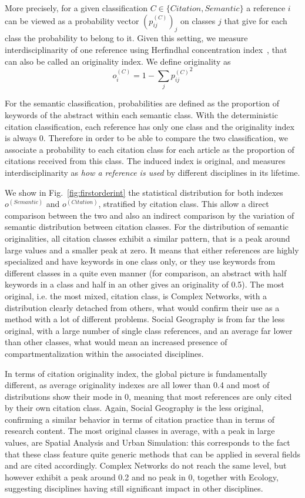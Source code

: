 More precisely, for a given classification $C \in \{ Citation,Semantic\}$ a reference $i$ can be viewed as a probability vector $(p_{ij}^{(C)})_j$ on classes $j$ that give for each class the probability to belong to it. Given this setting, we measure interdisciplinarity of one reference using Herfindhal concentration index~\citep{porter2009science}, that can also be called an originality index. We define originality as
\[
o_i^{(C)} = 1 - \sum_j {p_{ij}^{(C)}}^2
\]

For the semantic classification, probabilities are defined as the proportion of keywords of the abstract within each semantic class. With the deterministic citation classification, each reference has only one class and the originality index is always 0. Therefore in order to be able to compare the two classification, we associate a probability to each citation class for each article as the proportion of citations received from this class. The induced index is original, and measures interdisciplinarity as \emph{how a reference is used} by different disciplines in its lifetime.


We show in Fig.~\ref{fig:firstorderint} the statistical distribution for both indexes $o^{(Semantic)}$ and $o^{(Citation)}$, stratified by citation class. This allow a direct comparison between the two and also an indirect comparison by the variation of semantic distribution between citation classes. For the distribution of semantic originalities, all citation classes exhibit a similar pattern, that is a peak around large values and a smaller peak at zero. It means that either references are highly specialized and have keywords in one class only, or they use keywords from different classes in a quite even manner (for comparison, an abstract with half keywords in a class and half in an other gives an originality of 0.5). The most original, i.e. the most mixed, citation class, is Complex Networks, with a distribution clearly detached from others, what would confirm their use as a method with a lot of different problems. Social Geography is from far the less original, with a large number of single class references, and an average far lower than other classes, what would mean an increased presence of compartmentalization within the associated disciplines.


In terms of citation originality index, the global picture is fundamentally different, as average originality indexes are all lower than 0.4 and most of distributions show their mode in 0, meaning that most references are only cited by their own citation class. Again, Social Geography is the less original, confirming a similar behavior in terms of citation practice than in terms of research content. The most original classes in average, with a peak in large values, are Spatial Analysis and Urban Simulation: this corresponds to the fact that these class feature quite generic methods that can be applied in several fields and are cited accordingly. Complex Networks do not reach the same level, but however exhibit a peak around 0.2 and no peak in 0, together with Ecology, suggesting disciplines having still significant impact in other disciplines.


